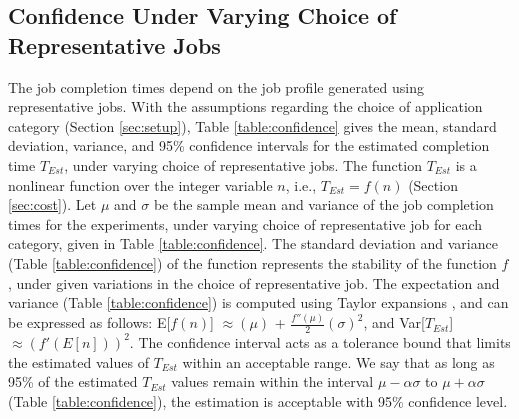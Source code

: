 \documentclass[conference]{IEEEtran}
\begin{document}
\subsection{Confidence Under Varying Choice of Representative Jobs}\label{sec:conf}
The job completion times depend on the job profile generated using representative
jobs. With the assumptions regarding the choice of application category (Section \ref{sec:setup}), Table
 \ref{table:confidence} gives the mean, standard deviation, variance, and 95\% confidence intervals for the
 estimated completion time $\mathit{T_{Est}}$, under varying choice of representative jobs. The function $T_{Est}$ is a nonlinear function
over the integer variable $n$, i.e., $\mathit{T_{Est}} = f(n)$ (Section \ref{sec:cost}). Let $\mu$ and $\sigma$ be the sample mean and
variance of the job completion times for the experiments, under varying choice of representative job for each category, given in Table
 \ref{table:confidence}. The standard deviation and variance (Table
 \ref{table:confidence}) of the
function represents the stability of the function $f$, under given variations in the choice of representative job. The expectation
and variance (Table
 \ref{table:confidence}) is computed using Taylor expansions \cite{leader2004numerical}, and can be expressed as follows:
E[$f(n)$] $\approx(\mu)$ + $\frac{f''(\mu)}{2}(\sigma)^2$, and Var[$\mathit{T_{Est}}$] $\approx (f'(E[n]))^2$.
The confidence interval acts as a tolerance bound that limits the estimated values of
$\mathit{T_{Est}}$ within an acceptable range.
 We say that as long as 95\% of the estimated $\mathit{T_{Est}}$ values remain
within the interval $\mu - \alpha\sigma$ to $\mu + \alpha\sigma$ (Table
 \ref{table:confidence}), the estimation is acceptable
with 95\% confidence level.
\end{document}

